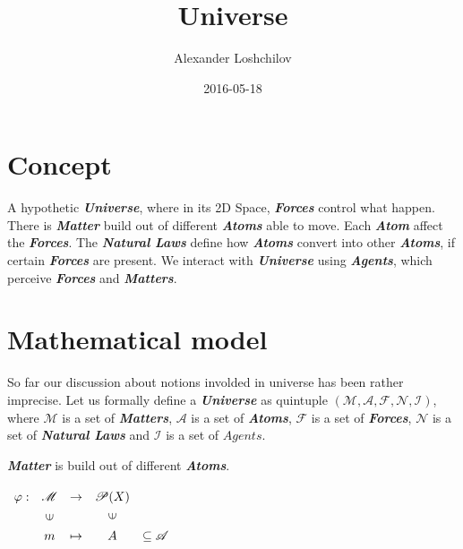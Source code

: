 \documentclass[a4paper]{article}
\title{Universe}
\author{Alexander Loshchilov}
\date{2016-05-18}
\begin{document}
\maketitle



\newpage

\tableofcontents

\newpage

\section{Concept}

A hypothetic \textit{\textbf{Universe}}, where in its 2D Space, \textit{\textbf{Forces}} control what happen. There is \textit{\textbf{Matter}} build out of different \textit{\textbf{Atoms}} able to move. Each \textit{\textbf{Atom}} affect the \textit{\textbf{Forces}}. The \textit{\textbf{Natural Laws}} define how \textit{\textbf{Atoms}} convert into other \textit{\textbf{Atoms}}, if certain \textit{\textbf{Forces}} are present. We interact with \textit{\textbf{Universe}} using \textit{\textbf{Agents}}, which perceive \textit{\textbf{Forces}} and \textit{\textbf{Matters}}.

\newpage

\section{Mathematical model} 

So far our discussion about notions involded in universe has been rather imprecise.
Let us formally define a \textit{\textbf{Universe}} as quintuple
$ (\mathscr{M}, \mathscr{A}, \mathscr{F}, \mathscr{N}, \mathscr{I}) $,
where $ \mathscr{M} $ is a set of \textit{\textbf{Matters}}, $ \mathscr{A} $ is a set of \textit{\textbf{Atoms}},
$ \mathscr{F} $ is a set of \textit{\textbf{Forces}}, $ \mathscr{N} $ is a set of \textit{\textbf{Natural Laws}} and
$ \mathscr{I} $ is a set of $ Agents $.

\textit{\textbf{Matter}} is build out of different \textit{\textbf{Atoms}}.

$\renewcommand{\arraystretch}{1.3}
\begin{array}[c]{ccccc}
\varphi:&\mathscr{M}&\rightarrow&\mathscr{P}(X)\\
&\rotatebox[origin=c]{90}{{$\in$}}&&\rotatebox{90}{$\in$}&\\
&m&\mapsto& A &\subseteq \mathscr{A}
\end{array}$
\end{document}
